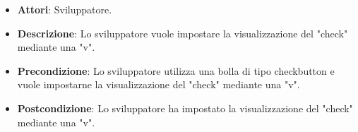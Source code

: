 
\FloatBarrier
\begin{itemize}
\item\textbf{Attori}: Sviluppatore.
\item\textbf{Descrizione}: Lo sviluppatore vuole impostare la visualizzazione del "check" mediante una "v".
\item\textbf{Precondizione}: Lo sviluppatore utilizza una bolla di tipo checkbutton e vuole impostarne la visualizzazione del "check" mediante una "v".
\item\textbf{Postcondizione}: Lo sviluppatore ha impostato la visualizzazione del "check" mediante una "v".
\end{itemize}
